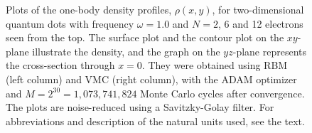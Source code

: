 \begin{figure}
	\caption{Plots of the one-body density profiles, $\rho(x,y)$, for two-dimensional quantum dots with frequency $\omega=1.0$ and $N=2$, 6 and 12 electrons seen from the top. The surface plot and the contour plot on the $xy$-plane illustrate the density, and the graph on the $yz$-plane represents the cross-section through $x=0$. They were obtained using RBM (left column) and VMC (right column), with the ADAM optimizer and $M=2^{30}=1,073,741,824$ Monte Carlo cycles after convergence. The plots are noise-reduced using a Savitzky-Golay filter. For abbreviations and description of the natural units used, see the text.}
	\label{fig:OB_interaction_1p0w1}
\end{figure}
\begin{figure}
	\centering
	\captionsetup[subfigure]{labelformat=empty}
	\hspace{0.1cm}
	\hspace{-0.0cm}
	\\
	

\end{figure}
